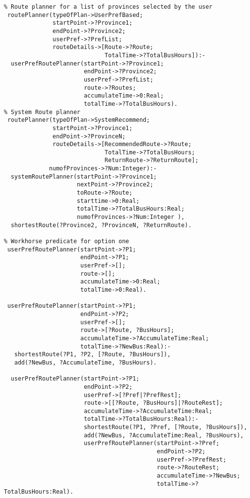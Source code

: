 \begin{verbatim}
% Route planner for a list of provinces selected by the user
 routePlanner(typeOfPlan->UserPrefBased;
              startPoint->?Province1;  
              endPoint->?Province2;  
              userPref->?PrefList; 
              routeDetails->[Route->?Route;   
                             TotalTime->?TotalBusHours]):-
  userPrefRoutePlanner(startPoint->?Province1; 
                       endPoint->?Province2; 
                       userPref->?PrefList; 
                       route->?Routes;
                       accumulateTime->0:Real; 
                       totalTime->?TotalBusHours).
% System Route planner                        
 routePlanner(typeOfPlan->SystemRecommend;
              startPoint->?Province1;  
              endPoint->?ProvinceN;  
              routeDetails->[RecommendedRoute->?Route;   
                             TotalTime->?TotalBusHours; 
                             ReturnRoute->?ReturnRoute];
             numofProvinces->?Num:Integer):-
  systemRoutePlanner(startPoint->?Province1; 
                     nextPoint->?Province2;  
                     toRoute->?Route; 
                     starttime->0:Real; 
                     totalTime->?TotalBusHours:Real; 
                     numofProvinces->?Num:Integer ),
  shortestRoute(?Province2, ?ProvinceN, ?ReturnRoute).
  
% Workhorse predicate for option one
 userPrefRoutePlanner(startPoint->?P1; 
                      endPoint->?P1; 
                      userPref->[]; 
                      route->[]; 
                      accumulateTime->0:Real; 
                      totalTime->0:Real).

 userPrefRoutePlanner(startPoint->?P1; 
                      endPoint->?P2; 
                      userPref->[]; 
                      route->[?Route, ?BusHours]; 
                      accumulateTime->?AccumulateTime:Real; 
                      totalTime->?NewBus:Real):-
   shortestRoute(?P1, ?P2, [?Route, ?BusHours]),
   add(?NewBus, ?AccumulateTime, ?BusHours).

  userPrefRoutePlanner(startPoint->?P1; 
                       endPoint->?P2; 
                       userPref->[?Pref|?PrefRest]; 
                       route->[[?Route, ?BusHours]|?RouteRest]; 
                       accumulateTime->?AccumulateTime:Real; 
                       totalTime->?TotalBusHours:Real):-
                       shortestRoute(?P1, ?Pref, [?Route, ?BusHours]),
                       add(?NewBus, ?AccumulateTime:Real, ?BusHours),
                       userPrefRoutePlanner(startPoint->?Pref; 
                                            endPoint->?P2; 
                                            userPref->?PrefRest; 
                                            route->?RouteRest; 
                                            accumulateTime->?NewBus; 
                                            totalTime->?TotalBusHours:Real).
 

\end{verbatim}
